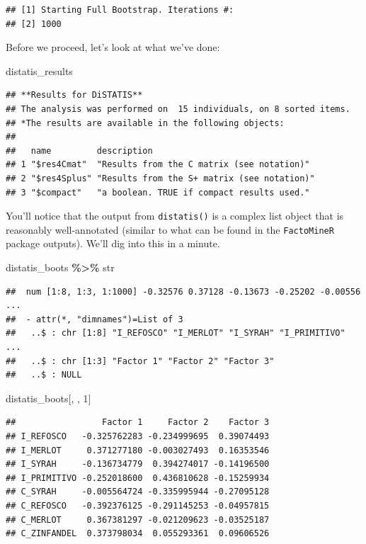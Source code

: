 \documentclass[
]{book}
\newenvironment{Shaded}{\begin{snugshade}}{\end{snugshade}}
\newcommand{\DecValTok}[1]{\textcolor[rgb]{0.00,0.00,0.81}{#1}}
\newcommand{\NormalTok}[1]{#1}
\newcommand{\SpecialCharTok}[1]{\textcolor[rgb]{0.81,0.36,0.00}{\textbf{#1}}}
\begin{document}
\begin{verbatim}
## [1] Starting Full Bootstrap. Iterations #: 
## [2] 1000
\end{verbatim}

Before we proceed, let's look at what we've done:

\begin{Shaded}
\begin{Highlighting}[]
\NormalTok{distatis\_results}
\end{Highlighting}
\end{Shaded}

\begin{verbatim}
## **Results for DiSTATIS**
## The analysis was performed on  15 individuals, on 8 sorted items.
## *The results are available in the following objects:
## 
##   name         description                                
## 1 "$res4Cmat"  "Results from the C matrix (see notation)" 
## 2 "$res4Splus" "Results from the S+ matrix (see notation)"
## 3 "$compact"   "a boolean. TRUE if compact results used."
\end{verbatim}

You'll notice that the output from \texttt{distatis()} is a complex list object that is reasonably well-annotated (similar to what can be found in the \texttt{FactoMineR} package outputs). We'll dig into this in a minute.

\begin{Shaded}
\begin{Highlighting}[]
\NormalTok{distatis\_boots }\SpecialCharTok{\%\textgreater{}\%}\NormalTok{ str}
\end{Highlighting}
\end{Shaded}

\begin{verbatim}
##  num [1:8, 1:3, 1:1000] -0.32576 0.37128 -0.13673 -0.25202 -0.00556 ...
##  - attr(*, "dimnames")=List of 3
##   ..$ : chr [1:8] "I_REFOSCO" "I_MERLOT" "I_SYRAH" "I_PRIMITIVO" ...
##   ..$ : chr [1:3] "Factor 1" "Factor 2" "Factor 3"
##   ..$ : NULL
\end{verbatim}

\begin{Shaded}
\begin{Highlighting}[]
\NormalTok{distatis\_boots[, , }\DecValTok{1}\NormalTok{]}
\end{Highlighting}
\end{Shaded}

\begin{verbatim}
##                 Factor 1     Factor 2    Factor 3
## I_REFOSCO   -0.325762283 -0.234999695  0.39074493
## I_MERLOT     0.371277180 -0.003027493  0.16353546
## I_SYRAH     -0.136734779  0.394274017 -0.14196500
## I_PRIMITIVO -0.252018600  0.436810628 -0.15259934
## C_SYRAH     -0.005564724 -0.335995944 -0.27095128
## C_REFOSCO   -0.392376125 -0.291145253 -0.04957815
## C_MERLOT     0.367381297 -0.021209623 -0.03525187
## C_ZINFANDEL  0.373798034  0.055293361  0.09606526
\end{verbatim}
\end{document}
